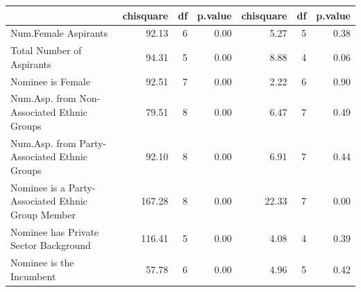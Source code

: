 \begin{table}[ht]
\centering
\label{tab:balance.main}
\begin{tabular}{lrrrrrr}
  \hline
 & chisquare & df & p.value & chisquare & df & p.value \\ 
  \hline
Num.Female Aspirants & 92.13 & 6 & 0.00 & 5.27 & 5 & 0.38 \\ 
  Total Number of Aspirants & 94.31 & 5 & 0.00 & 8.88 & 4 & 0.06 \\ 
  Nominee is Female & 92.51 & 7 & 0.00 & 2.22 & 6 & 0.90 \\ 
  Num.Asp. from Non-Associated Ethnic Groups & 79.51 & 8 & 0.00 & 6.47 & 7 & 0.49 \\ 
  Num.Asp. from Party-Associated Ethnic Groups & 92.10 & 8 & 0.00 & 6.91 & 7 & 0.44 \\ 
  Nominee is a Party-Associated Ethnic Group Member & 167.28 & 8 & 0.00 & 22.33 & 7 & 0.00 \\ 
  Nominee has Private Sector Background & 116.41 & 5 & 0.00 & 4.08 & 4 & 0.39 \\ 
  Nominee is the Incumbent & 57.78 & 6 & 0.00 & 4.96 & 5 & 0.42 \\ 
   \hline
\end{tabular}
\end{table}

